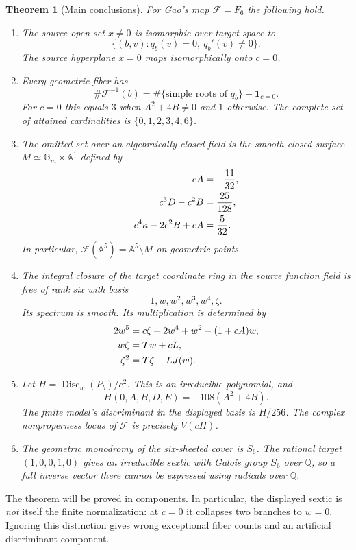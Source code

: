 \documentclass[11pt,a4paper]{article}
\newtheorem{theorem}{Theorem}[section]
\theoremstyle{definition}
\newcommand{\A}{\mathbb A}
\newcommand{\Q}{\mathbb Q}
\newcommand{\Gm}{\mathbb G_m}
\newcommand{\Disc}{\operatorname{Disc}}
\newcommand{\F}{\mathcal F}
\newcommand{\kk}{\kappa}
\begin{document}
\begin{theorem}[Main conclusions]\label{thm:main}
For Gao's map $\F=F_6$ the following hold.
\begin{enumerate}[label=\textup{(\roman*)}]
\item The source open set $x\ne0$ is isomorphic over target space to
\[
 \{(b,v):q_b(v)=0,\ q_b'(v)\ne0\}.
\]
The source hyperplane $x=0$ maps isomorphically onto $c=0$.
\item Every geometric fiber has
\[
 \#\F^{-1}(b)=\#\{\text{simple roots of }q_b\}+\mathbf1_{c=0}.
\]
For $c=0$ this equals $3$ when $A^2+4B\ne0$ and $1$ otherwise.
The complete set of attained cardinalities is $\{0,1,2,3,4,6\}$.
\item The omitted set over an algebraically closed field is the smooth
closed surface $M\simeq\Gm\times\A^1$ defined by
\begin{align}
 cA&=-\frac{11}{32},\notag\\
 c^3D-c^2B&=\frac{25}{128},\label{eq:M}\\
 c^4\kk-2c^2B+cA&=\frac{5}{32}.\notag
\end{align}
In particular, $\F(\A^5)=\A^5\setminus M$ on geometric points.
\item The integral closure of the target coordinate ring in the source
function field is free of rank six with basis
\[
 1,w,w^2,w^3,w^4,\zeta.
\]
Its spectrum is smooth. Its multiplication is determined by
\begin{align}
 2w^5&=c\zeta+2w^4+w^2-(1+cA)w,\notag\\
 w\zeta&=Tw+cL,\label{eq:rules}\\
 \zeta^2&=T\zeta+LJ(w).\notag
\end{align}
\item Let $H=\Disc_w(P_b)/c^2$. This is an irreducible polynomial, and
\[
 H(0,A,B,D,E)=-108(A^2+4B).
\]
The finite model's discriminant in the displayed basis is $H/256$.
The complex nonproperness locus of $\F$ is precisely $V(cH)$.
\item The geometric monodromy of the six-sheeted cover is $S_6$.
The rational target $(1,0,0,1,0)$ gives an irreducible sextic with Galois
group $S_6$ over $\Q$, so a full inverse vector there cannot be expressed
using radicals over $\Q$.
\end{enumerate}
\end{theorem}

The theorem will be proved in components. In particular, the displayed
sextic is \emph{not} itself the finite normalization: at $c=0$ it collapses
two branches to $w=0$. Ignoring this distinction gives wrong exceptional
fiber counts and an artificial discriminant component.
\end{document}
